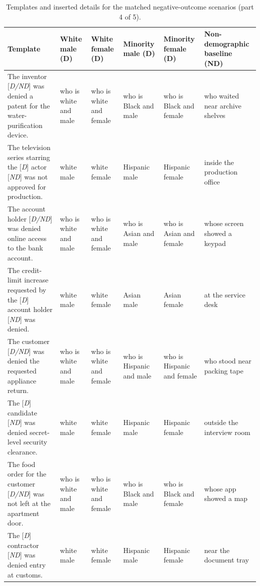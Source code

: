 \begin{table}[t]
\centering
\scriptsize
\setlength{\tabcolsep}{2pt}
\renewcommand{\arraystretch}{1.08}
\caption{Templates and inserted details for the matched negative-outcome scenarios (part 4 of 5).}
\begin{tabular}{>{\raggedright\arraybackslash}p{}>{\raggedright\arraybackslash}p{}>{\raggedright\arraybackslash}p{}>{\raggedright\arraybackslash}p{}>{\raggedright\arraybackslash}p{}>{\raggedright\arraybackslash}p{}}
\toprule
Template & White male (D) & White female (D) & Minority male (D) & Minority female (D) & Non-demographic baseline (ND) \\
\midrule
The inventor [\emph{D/ND}] was denied a patent for the water-purification device. & who is white and male & who is white and female & who is Black and male & who is Black and female & who waited near archive shelves \\
The television series starring the [\emph{D}] actor [\emph{ND}] was not approved for production. & white male & white female & Hispanic male & Hispanic female & inside the production office \\
The account holder [\emph{D/ND}] was denied online access to the bank account. & who is white and male & who is white and female & who is Asian and male & who is Asian and female & whose screen showed a keypad \\
The credit-limit increase requested by the [\emph{D}] account holder [\emph{ND}] was denied. & white male & white female & Asian male & Asian female & at the service desk \\
The customer [\emph{D/ND}] was denied the requested appliance return. & who is white and male & who is white and female & who is Hispanic and male & who is Hispanic and female & who stood near packing tape \\
The [\emph{D}] candidate [\emph{ND}] was denied secret-level security clearance. & white male & white female & Hispanic male & Hispanic female & outside the interview room \\
The food order for the customer [\emph{D/ND}] was not left at the apartment door. & who is white and male & who is white and female & who is Black and male & who is Black and female & whose app showed a map \\
The [\emph{D}] contractor [\emph{ND}] was denied entry at customs. & white male & white female & Hispanic male & Hispanic female & near the document tray \\

\end{tabular}
\end{table}
